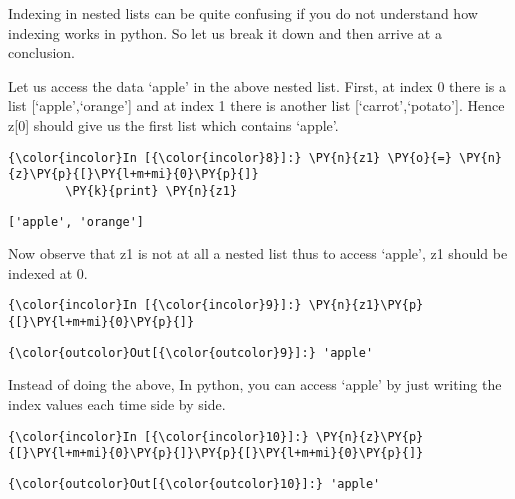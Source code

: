     Indexing in nested lists can be quite confusing if you do not understand
how indexing works in python. So let us break it down and then arrive at
a conclusion.

Let us access the data `apple' in the above nested list. First, at index
0 there is a list {[}`apple',`orange'{]} and at index 1 there is another
list {[}`carrot',`potato'{]}. Hence z{[}0{]} should give us the first
list which contains `apple'.

    \begin{Verbatim}[commandchars=\\\{\}]
{\color{incolor}In [{\color{incolor}8}]:} \PY{n}{z1} \PY{o}{=} \PY{n}{z}\PY{p}{[}\PY{l+m+mi}{0}\PY{p}{]}
        \PY{k}{print} \PY{n}{z1}
\end{Verbatim}

    \begin{Verbatim}[commandchars=\\\{\}]
['apple', 'orange']
    \end{Verbatim}

    Now observe that z1 is not at all a nested list thus to access `apple',
z1 should be indexed at 0.

    \begin{Verbatim}[commandchars=\\\{\}]
{\color{incolor}In [{\color{incolor}9}]:} \PY{n}{z1}\PY{p}{[}\PY{l+m+mi}{0}\PY{p}{]}
\end{Verbatim}

            \begin{Verbatim}[commandchars=\\\{\}]
{\color{outcolor}Out[{\color{outcolor}9}]:} 'apple'
\end{Verbatim}
        
    Instead of doing the above, In python, you can access `apple' by just
writing the index values each time side by side.

    \begin{Verbatim}[commandchars=\\\{\}]
{\color{incolor}In [{\color{incolor}10}]:} \PY{n}{z}\PY{p}{[}\PY{l+m+mi}{0}\PY{p}{]}\PY{p}{[}\PY{l+m+mi}{0}\PY{p}{]}
\end{Verbatim}

            \begin{Verbatim}[commandchars=\\\{\}]
{\color{outcolor}Out[{\color{outcolor}10}]:} 'apple'
\end{Verbatim}
        
